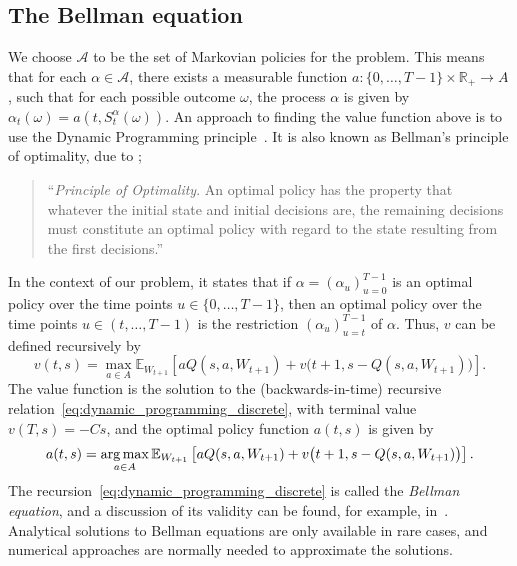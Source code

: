 \documentclass[main.tex]{subfiles}
\begin{document}
\subsection{The Bellman equation}\label{subsec:adp_bellman_equation}
We choose $\mathcal{A}$ to be the set of Markovian policies for the
problem. This means that for each $\alpha\in \mathcal{A}$, there exists a
measurable function $a:\{0,\dots,T-1\}\times \mathbb{R}_+\to A$, such
that for each possible outcome
$\omega$, the process $\alpha$ is given by
$\alpha_{t}(\omega) = a(t,S_t^\alpha(\omega))$.
An approach to finding the value function above is to use the Dynamic
Programming principle~\citep{bertsekas2005dynamic}. It is also known
as Bellman's principle of optimality, due to \citet{bellman1954theory};
\begin{quote}
  \singlespacing
  ``\emph{Principle of Optimality}. An optimal policy has the property that
  whatever the initial state and initial decisions are, the remaining decisions
  must constitute an optimal policy with regard to the state resulting
  from the first decisions.''
\end{quote}
In the context of our problem, it states that
if $\alpha = {(\alpha_u)}_{u=0}^{T-1}$ is an optimal policy over the time
points $u\in\{0,\dots,T-1\}$, then an optimal policy
over the time points $u\in(t,\dots,T-1)$ is the restriction
${(\alpha_u)}_{u=t}^{T-1}$ of $\alpha$.
Thus, $v$ can be defined recursively by
\begin{equation}\label{eq:dynamic_programming_discrete}
  v(t,s)=\max_{a\in A}\mathbb{E}_{W_{t+1}}\left[
    aQ(s,a,W_{t+1})
    +v\bigl(t+1,s-Q(s,a,W_{t+1})\bigr)\right].
\end{equation}
The value function is the solution to the (backwards-in-time)
recursive relation~\eqref{eq:dynamic_programming_discrete}, with
terminal value $v(T,s)=-Cs$, and the optimal policy
function $a(t,s)$ is given by
\begin{equation}
  a(t,s) =\operatorname*{arg\,max}_{a\in A}\mathbb{E}_{W_{t+1}}\left[
    aQ(s,a,W_{t+1})
    +v\bigl(t+1,s-Q(s,a,W_{t+1})\bigr)\right].
\end{equation}
The recursion~\eqref{eq:dynamic_programming_discrete} is called the
\emph{Bellman equation}, and a discussion
of its validity can be found, for example, in~\citet{bertsekas2005dynamic}.
Analytical solutions to Bellman equations are only available in
rare cases, and  numerical approaches are normally needed to
approximate the solutions.
\end{document}
